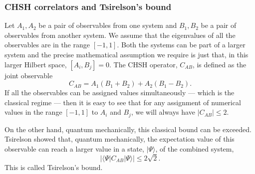\documentclass[12pt]{article}
\newcommand{\be}{\begin{equation}}
\newcommand{\ee}{\end{equation}}
\begin{document}
\subsubsection*{CHSH correlators and Tsirelson's bound }

Let $A_1, A_2$ be a pair of observables from one system  and  $B_1, B_2$ be a pair of observables from another system.    We assume that the eigenvalues of all the observables are in the range $[-1, 1]$. Both the systems can be part of a larger system and the precise mathematical assumption we require is just that, in this larger Hilbert space, $[A_i, B_j] = 0$. The CHSH operator, $C_{AB}$, is
defined as the joint observable
\be
\label{cabdefn}
C_{AB} =  A_1 (B_1 + B_2)  +  A_2 (B_1 - B_2).
\ee
If all the observables can be assigned values simultaneously --- which is the classical regime --- then it is easy to see that for any assignment of numerical values in the range $[-1,1]$ to $A_i$ and $B_j$, we will always have $|C_{AB}| \leq 2$.


On the other hand, quantum mechanically, this classical bound can be exceeded. Tsirelson \cite{cirel1980quantum} showed that, quantum mechanically, the expectation value of this observable can reach a larger value  in a state, $|\Psi \rangle$, of the combined system,
\be
|\langle \Psi |  C_{AB}  | \Psi \rangle| \leq 2 \sqrt{2}.
\ee
This is called Tsirelson's bound.
\end{document}
